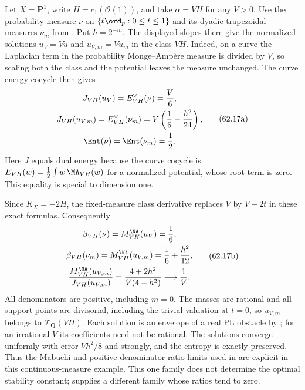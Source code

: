 \begin{example}
\label{ex:mpwn-continuous-beta-tests}
Let $X=\mathbf P^1$, write $H=c_1(\mathcal O(1))$, and take
$\alpha=VH$ for any $V>0$. Use the probability measure $\nu$ on
$\{t\ord_p:0\leq t\leq1\}$ and its dyadic trapezoidal measures
$\nu_m$ from .
Put $h=2^{-m}$. The displayed slopes there give the normalized
solutions $u_V=Vu$ and $u_{V,m}=Vu_m$ in the class $VH$.
Indeed, on a curve the Laplacian term in the probability
Monge--Amp\`ere measure is divided by $V$, so scaling both the
class and the potential leaves the measure unchanged.
The curve energy cocycle then gives
\[
 \begin{gathered}
 J_{VH}(u_V)=E_{VH}^\vee(\nu)=\frac V6,\\
 J_{VH}(u_{V,m})=E_{VH}^\vee(\nu_m)
                    =V\left(\frac16-\frac{h^2}{24}\right),\\
 \Ent(\nu)=\Ent(\nu_m)=\frac12.
 \end{gathered}
\tag{62.17a}\label{eq:mpwn-continuous-beta-energies}
\]
Here $J$ equals dual energy because the curve cocycle is
$E_{VH}(w)=\tfrac12\int w\,\MA_{VH}(w)$ for a normalized
potential, whose root term is zero. This equality is special
to dimension one.

Since $K_X=-2H$, the fixed-measure class derivative replaces
$V$ by $V-2t$ in these exact formulas. Consequently
\[
 \begin{gathered}
 \beta_{VH}(\nu)=M_{VH}^{\NA}(u_V)=\frac16,\\
 \beta_{VH}(\nu_m)=M_{VH}^{\NA}(u_{V,m})
                         =\frac16+\frac{h^2}{12},\\
 \frac{M_{VH}^{\NA}(u_{V,m})}{J_{VH}(u_{V,m})}
          =\frac{4+2h^2}{V(4-h^2)}\longrightarrow\frac1V.
 \end{gathered}
\tag{62.17b}\label{eq:mpwn-continuous-beta-ratios}
\]
All denominators are positive, including $m=0$. The masses are
rational and all support points are divisorial, including the
trivial valuation at $t=0$, so $u_{V,m}$ belongs to
$\mathcal T_{\mathbf Q}(VH)$. Each solution is an envelope of a
real PL obstacle by ; for an
irrational $V$ its coefficients need not be rational.
The solutions converge uniformly with error $Vh^2/8$ and
strongly, and the entropy is exactly preserved. Thus the
Mabuchi and positive-denominator ratio limits used in
are explicit in this continuous-measure example. This one
family does not determine the optimal stability constant;
 supplies a different
family whose ratios tend to zero.
\end{example}

